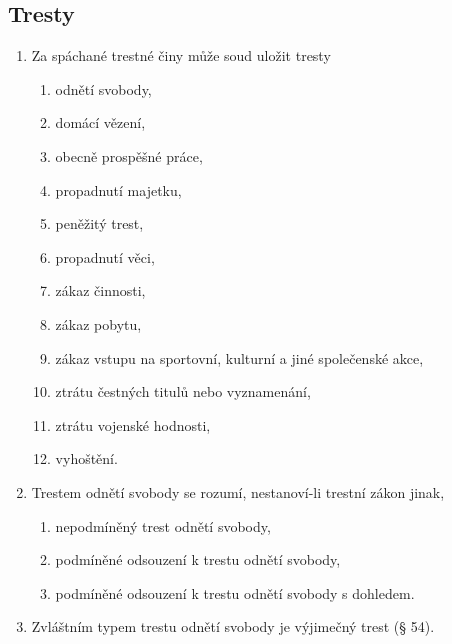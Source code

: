 \documentclass[10pt,a4paper,
twoside,%
]{report}
\begin{document}
\subsection{Tresty}
\begin{multicols}{2}
\begin{footnotesize}
\begin{enumerate}

\item Za spáchané trestné činy může soud uložit tresty

\begin{enumerate}
\item odnětí svobody,

\item domácí vězení,

\item obecně prospěšné práce,

\item propadnutí majetku,

\item peněžitý trest,

\item propadnutí věci,

\item zákaz činnosti,

\item zákaz pobytu,

\item zákaz vstupu na sportovní, kulturní a jiné společenské akce,

\item ztrátu čestných titulů nebo vyznamenání,

\item ztrátu vojenské hodnosti,

\item vyhoštění.

\end{enumerate}
\item Trestem odnětí svobody se rozumí, nestanoví-li trestní zákon jinak,
\begin{enumerate}

\item nepodmíněný trest odnětí svobody,

\item podmíněné odsouzení k trestu odnětí svobody,

\item podmíněné odsouzení k trestu odnětí svobody s dohledem.

\end{enumerate}
\item Zvláštním typem trestu odnětí svobody je výjimečný trest (§ 54).
\end{enumerate}
\end{footnotesize}
\end{multicols}
\end{document}
